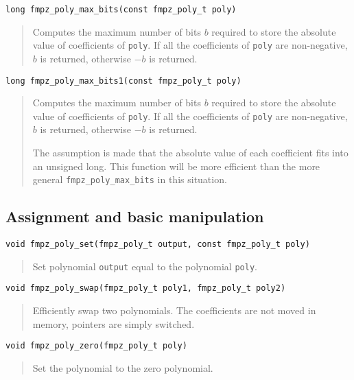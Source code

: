 \documentclass[a4paper,10pt]{article}
\newcommand{\code}{\lstinline}
\begin{document}
\begin{lstlisting}
long fmpz_poly_max_bits(const fmpz_poly_t poly)
\end{lstlisting}
\begin{quote}
Computes the maximum number of bits $b$ required to store the absolute value of coefficients of \code{poly}. If all the coefficients of \code{poly} are non-negative, $b$ is returned, otherwise $-b$ is returned. \end{quote}

\begin{lstlisting}
long fmpz_poly_max_bits1(const fmpz_poly_t poly)
\end{lstlisting}
\begin{quote}
Computes the maximum number of bits $b$ required to store the absolute value of coefficients of \code{poly}. If all the coefficients of \code{poly} are non-negative, $b$ is returned, otherwise $-b$ is returned. 

The assumption is made that the absolute value of each coefficient fits into an unsigned long. This function will be more efficient than the more general \code{fmpz_poly_max_bits} in this situation.
\end{quote}


\subsection{Assignment and basic manipulation}

\begin{lstlisting}
void fmpz_poly_set(fmpz_poly_t output, const fmpz_poly_t poly)
\end{lstlisting}
\begin{quote}
Set polynomial \code{output} equal to the polynomial \code{poly}.
\end{quote}

\begin{lstlisting}
void fmpz_poly_swap(fmpz_poly_t poly1, fmpz_poly_t poly2)
\end{lstlisting}
\begin{quote}
Efficiently swap two polynomials. The coefficients are not moved in memory, pointers are simply switched. \end{quote}

\begin{lstlisting}
void fmpz_poly_zero(fmpz_poly_t poly) 
\end{lstlisting}
\begin{quote}
Set the polynomial to the zero polynomial.
\end{quote}
\end{document}
